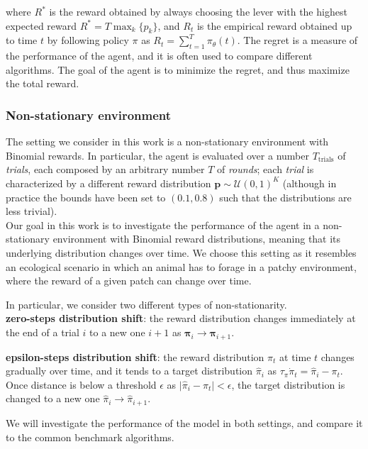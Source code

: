 \noindent where $R^{*}$ is the reward obtained by always choosing the lever with the highest expected reward $R^{*}=T\max_{k}\{p_{k}\}$, and $R_{t}$ is the empirical reward obtained up to time $t$ by following policy $\pi$ as $R_{t}=\sum^{T}_{t=1}\pi_{\theta}(t)$.
The regret is a measure of the performance of the agent, and it is often used to compare different algorithms. The goal of the agent is to minimize the regret, and thus maximize the total reward.

\subsubsection{Non-stationary environment}
\noindent The setting we consider in this work is a non-stationary environment with Binomial rewards. In particular, the agent is evaluated over a number $T_{\text{trials}}$ of \textit{trials}, each composed by an arbitrary number $T$ of \textit{rounds}; each \textit{trial} is characterized by a different
reward distribution $\mathbf{p}\sim\mathcal{U}(0,1)^{K}$ (although in practice the bounds have been set to $(0.1, 0.8)$ such that the distributions are less trivial). \\
\noindent Our goal in this work is to investigate the performance of the agent in a non-stationary environment with Binomial reward distributions, meaning that its underlying distribution changes over time.
We choose this setting as it resembles an ecological scenario in which an animal has to forage in a patchy environment, where the reward of a given patch can change over time.

\noindent In particular, we consider two different types of non-stationarity.\\
\textbf{zero-steps distribution shift}: the reward distribution changes immediately at the end of a trial $i$ to a new one $i+1$ as $\mathbf{\pi}_{i} \to \mathbf{\pi}_{i+1}$.

\noindent \textbf{epsilon-steps distribution shift}: the reward distribution $\pi_{t}$ at time $t$ changes gradually over time, and it tends to a target distribution $\hat{\pi}_{i}$ as $\tau_{\pi}\dot{\pi}_{t}=\hat{\pi}_{i}-\pi_{t}$. Once distance is below a threshold $\epsilon$ as $\vert \hat{\pi}_{i} - \pi_{t}\vert < \epsilon$, the target distribution is changed to a new one $\hat{\pi}_{i}\to\hat{\pi}_{i+1}$.

We will investigate the performance of the model in both settings, and compare it to the common benchmark algorithms.


